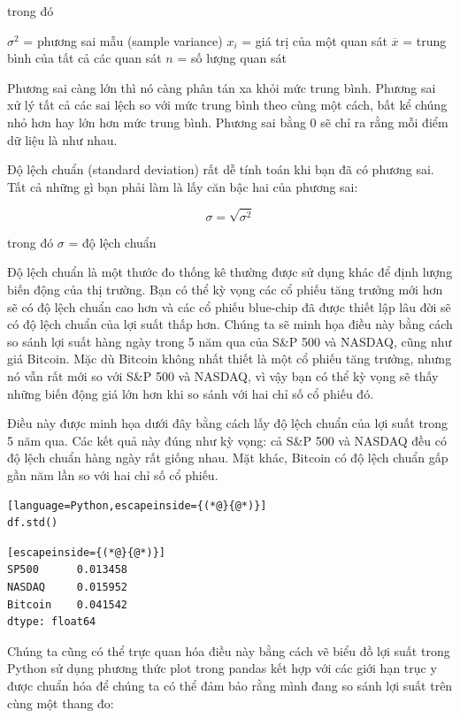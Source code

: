 trong đó

$\sigma^2$ = phương sai mẫu (sample variance) $x_i$ = giá trị của một quan sát $\overline{x}$ = trung bình của tất cả các quan sát $n$ = số lượng quan sát

Phương sai càng lớn thì nó càng phân tán xa khỏi mức trung bình. Phương sai xử lý tất cả các sai lệch so với mức trung bình theo cùng một cách, bất kể chúng nhỏ hơn hay lớn hơn mức trung bình. Phương sai bằng 0 sẽ chỉ ra rằng mỗi điểm dữ liệu là như nhau.

Độ lệch chuẩn (standard deviation) rất dễ tính toán khi bạn đã có phương sai. Tất cả những gì bạn phải làm là lấy căn bậc hai của phương sai:

\[\sigma = \sqrt{\sigma^2}\]

trong đó $\sigma$ = độ lệch chuẩn

Độ lệch chuẩn là một thước đo thống kê thường được sử dụng khác để định lượng biến động của thị trường. Bạn có thể kỳ vọng các cổ phiếu tăng trưởng mới hơn sẽ có độ lệch chuẩn cao hơn và các cổ phiếu blue-chip đã được thiết lập lâu đời sẽ có độ lệch chuẩn của lợi suất thấp hơn. Chúng ta sẽ minh họa điều này bằng cách so sánh lợi suất hàng ngày trong 5 năm qua của S\&P 500 và NASDAQ, cũng như giá Bitcoin. Mặc dù Bitcoin không nhất thiết là một cổ phiếu tăng trưởng, nhưng nó vẫn rất mới so với S\&P 500 và NASDAQ, vì vậy bạn có thể kỳ vọng sẽ thấy những biến động giá lớn hơn khi so sánh với hai chỉ số cổ phiếu đó.

Điều này được minh họa dưới đây bằng cách lấy độ lệch chuẩn của lợi suất trong 5 năm qua. Các kết quả này đúng như kỳ vọng: cả S\&P 500 và NASDAQ đều có độ lệch chuẩn hàng ngày rất giống nhau. Mặt khác, Bitcoin có độ lệch chuẩn gấp gần năm lần so với hai chỉ số cổ phiếu.

\begin{lstlisting}[language=Python,escapeinside={(*@}{@*)}]
df.std()
\end{lstlisting}

\begin{lstlisting}[escapeinside={(*@}{@*)}]
SP500      0.013458
NASDAQ     0.015952
Bitcoin    0.041542
dtype: float64
\end{lstlisting}

Chúng ta cũng có thể trực quan hóa điều này bằng cách vẽ biểu đồ lợi suất trong Python sử dụng phương thức plot trong pandas kết hợp với các giới hạn trục y được chuẩn hóa để chúng ta có thể đảm bảo rằng mình đang so sánh lợi suất trên cùng một thang đo:


